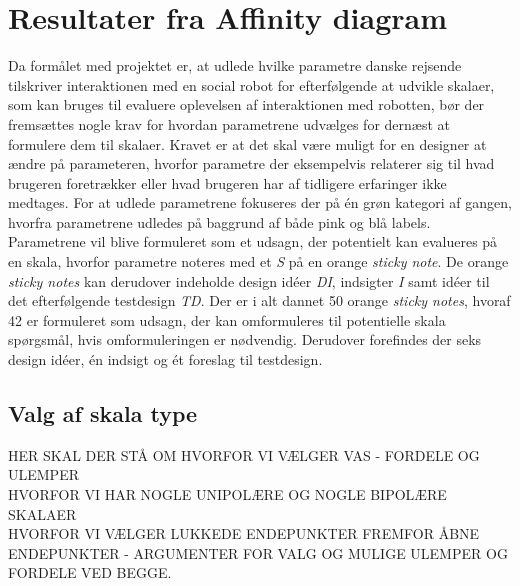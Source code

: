 \section{Resultater fra Affinity diagram}
\label{ParametreDatabehandlingAffinityDiagram}
%
%
Da formålet med projektet er, at udlede hvilke parametre danske rejsende tilskriver interaktionen med en social robot for efterfølgende at udvikle skalaer, som kan bruges til evaluere oplevelsen af interaktionen med robotten, bør der fremsættes nogle krav for hvordan parametrene udvælges for dernæst at formulere dem til skalaer. Kravet er at det skal være muligt for en designer at ændre på parameteren, hvorfor parametre der eksempelvis relaterer sig til hvad brugeren foretrækker eller hvad brugeren har af tidligere erfaringer ikke medtages. \blankline
%
For at udlede parametrene fokuseres der på én grøn kategori af gangen, hvorfra parametrene udledes på baggrund af både pink og blå labels. Parametrene vil blive formuleret som et udsagn, der potentielt kan evalueres på en skala, hvorfor parametre noteres med et \textit{S} på en orange \textit{sticky note}. De orange \textit{sticky notes} kan derudover indeholde design idéer \textit{DI}, indsigter \textit{I} samt idéer til det efterfølgende testdesign \textit{TD}. Der er i alt dannet 50 orange \textit{sticky notes}, hvoraf 42 er formuleret som udsagn, der kan omformuleres til potentielle skala spørgsmål, hvis omformuleringen er nødvendig. Derudover forefindes der seks design idéer, én indsigt og ét foreslag til testdesign.
%
\subsection{Valg af skala type}
\label{ParametreSkalaType}
%
%
HER SKAL DER STÅ OM HVORFOR VI VÆLGER VAS - FORDELE OG ULEMPER\\
HVORFOR VI HAR NOGLE UNIPOLÆRE OG NOGLE BIPOLÆRE SKALAER\\
HVORFOR VI VÆLGER LUKKEDE ENDEPUNKTER FREMFOR ÅBNE ENDEPUNKTER - ARGUMENTER FOR VALG OG MULIGE ULEMPER OG FORDELE VED BEGGE.\blankline


